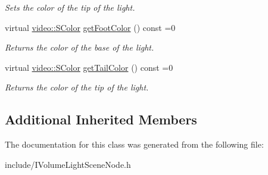 \begin{DoxyCompactItemize}
\begin{DoxyCompactList}\small\item\em Sets the color of the tip of the light. \end{DoxyCompactList}\item 
virtual \hyperlink{classirr_1_1video_1_1SColor}{video\+::\+S\+Color} \hyperlink{classirr_1_1scene_1_1IVolumeLightSceneNode_abbdc1a18786727a50870b90650f2936b}{get\+Foot\+Color} () const  =0\hypertarget{classirr_1_1scene_1_1IVolumeLightSceneNode_abbdc1a18786727a50870b90650f2936b}{}\label{classirr_1_1scene_1_1IVolumeLightSceneNode_abbdc1a18786727a50870b90650f2936b}

\begin{DoxyCompactList}\small\item\em Returns the color of the base of the light. \end{DoxyCompactList}\item 
virtual \hyperlink{classirr_1_1video_1_1SColor}{video\+::\+S\+Color} \hyperlink{classirr_1_1scene_1_1IVolumeLightSceneNode_afc57b7745d0a2cc8aac54d3a06791c5d}{get\+Tail\+Color} () const  =0\hypertarget{classirr_1_1scene_1_1IVolumeLightSceneNode_afc57b7745d0a2cc8aac54d3a06791c5d}{}\label{classirr_1_1scene_1_1IVolumeLightSceneNode_afc57b7745d0a2cc8aac54d3a06791c5d}

\begin{DoxyCompactList}\small\item\em Returns the color of the tip of the light. \end{DoxyCompactList}\end{DoxyCompactItemize}
\subsection*{Additional Inherited Members}


The documentation for this class was generated from the following file\+:\begin{DoxyCompactItemize}
\item 
include/I\+Volume\+Light\+Scene\+Node.\+h\end{DoxyCompactItemize}
